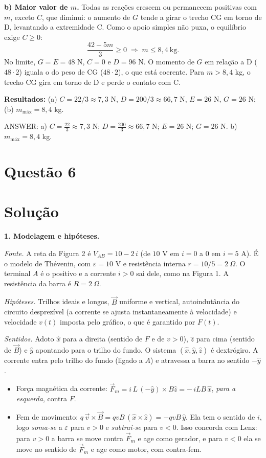 \documentclass{article}%
\begin{document}
\textbf{b) Maior valor de $m$.} Todas as reações crescem ou permanecem positivas com $m$, exceto $C$, que diminui: o aumento de $G$ tende a girar o trecho CG em torno de D, levantando a extremidade C. Como o apoio simples não puxa, o equilíbrio exige $C\ge 0$:
\[
\frac{42-5m}{3}\ge 0 \;\Rightarrow\; m\le 8{,}4\ \text{kg}.
\]
No limite, $G=E=48$ N, $C=0$ e $D=96$ N. O momento de $G$ em relação a D ($48\cdot2$) iguala o do peso de CG ($48\cdot 2$), o que está coerente. Para $m>8{,}4$ kg, o trecho CG gira em torno de D e perde o contato com C.

\textbf{Resultados:} (a) $C=22/3\approx7{,}3$ N, $D=200/3\approx66{,}7$ N, $E=26$ N, $G=26$ N; (b) $m_{\text{máx}}=8{,}4$ kg.

ANSWER: a) $C=\frac{22}{3}\approx 7{,}3$ N; $D=\frac{200}{3}\approx 66{,}7$ N; $E=26$ N; $G=26$ N. b) $m_{\text{máx}}=8{,}4$ kg.%
\newpage%
\section*{Questão 6}

\section*{Solução}

\textbf{1. Modelagem e hipóteses.}

\emph{Fonte.} A reta da Figura 2 é $V_{AB}=10-2\,i$ (de $10$ V em $i=0$ a $0$ em $i=5$ A). É o modelo de Thévenin, com $\varepsilon=10$ V e resistência interna $r=10/5=2\ \Omega$. O terminal $A$ é o positivo e a corrente $i>0$ sai dele, como na Figura 1. A resistência da barra é $R=2\ \Omega$.

\emph{Hipóteses.} Trilhos ideais e longos, $\vec B$ uniforme e vertical, autoindutância do circuito desprezível (a corrente se ajusta instantaneamente à velocidade) e velocidade $v(t)$ imposta pelo gráfico, o que é garantido por $F(t)$.

\emph{Sentidos.} Adoto $\hat x$ para a direita (sentido de $F$ e de $v>0$), $\hat z$ para cima (sentido de $\vec B$) e $\hat y$ apontando para o trilho do fundo. O sistema $(\hat x,\hat y,\hat z)$ é dextrógiro. A corrente entra pelo trilho do fundo (ligado a $A$) e atravessa a barra no sentido $-\hat y$.
\begin{itemize}
\item Força magnética da corrente: $\vec F_m=i\,L\,(-\hat y)\times B\hat z=-\,iLB\,\hat x$, \emph{para a esquerda}, contra $F$.
\item Fem de movimento: $q\,\vec v\times\vec B=qvB\,(\hat x\times\hat z)=-qvB\,\hat y$. Ela tem o sentido de $i$, logo \emph{soma-se} a $\varepsilon$ para $v>0$ e \emph{subtrai-se} para $v<0$. Isso concorda com Lenz: para $v>0$ a barra se move contra $\vec F_m$ e age como gerador, e para $v<0$ ela se move no sentido de $\vec F_m$ e age como motor, com contra-fem.
\end{itemize}
\end{document}
